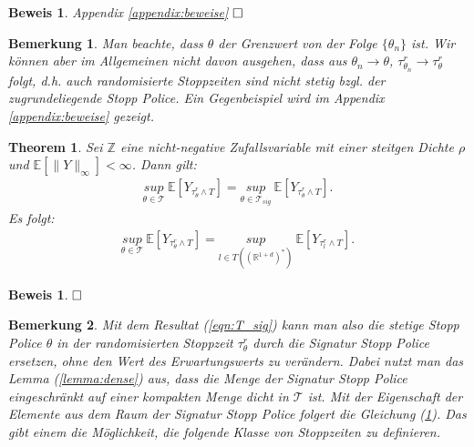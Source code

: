 \documentclass[12pt,titlepage,headsepline]{article}
\newtheorem{theorem}{Theorem}[section]
\newtheorem*{beweis}{Beweis}
\newtheorem*{beweis-non}{Beweis}
\newtheorem*{bemerkung*}{Bemerkung}
\begin{document}
      \begin{beweis}
        \textup{
        Appendix \ref{appendix:beweise}
        }
        $\hfill\Box$
      \end{beweis}
      \begin{bemerkung*}
        \textup{
        Man beachte, dass $\theta$ der Grenzwert von der Folge $\{\theta_n\}$ ist. Wir können aber im Allgemeinen nicht davon ausgehen, dass aus $\theta_n \rightarrow \theta$, $\tau_{\theta_n}^r \rightarrow \tau_\theta^r$ folgt, d.h. auch randomisierte Stoppzeiten sind nicht stetig bzgl. der zugrundeliegende Stopp Police. Ein Gegenbeispiel wird im Appendix \ref{appendix:beweise} gezeigt.
        }
      \end{bemerkung*}

      \begin{theorem}
        Sei $\mathbb{Z}$ eine nicht-negative Zufallsvariable mit einer steitgen Dichte $\rho$ und $\mathbb{E}[\lVert Y\rVert_\infty]<\infty$. Dann gilt:
        \begin{align}\label{eqn:T_sig}
          \underset{\theta \in \mathcal{T}}{sup} \ \mathbb{E}[Y_{\tau^{r}_{\theta}\land T}] = \underset{\theta \in \mathcal{T}_{sig}}{sup} \ \mathbb{E}[Y_{\tau^{r}_{\theta}\land T}].
        \end{align}
        Es folgt:
        \begin{align}
          \underset{\theta \in \mathcal{T}}{sup} \ \mathbb{E}[Y_{\tau^{r}_{\theta}\land T}] = \underset{l \in T((\mathbb{R}^{1+d})^*)}{sup} \ \mathbb{E}[Y_{\tau^{r}_{l}\land T}].
        \end{align}\label{eqn:l_T}
      \end{theorem}
      \begin{beweis-non}
        \textup{
        \cite{bayer_optimal_2020,Prop 5.3}
        $\hfill\Box$
        }
      \end{beweis-non}
      \begin{bemerkung*}
        \textup{
        Mit dem Resultat (\ref{eqn:T_sig}) kann man also die stetige Stopp Police $\theta$ in der randomisierten Stoppzeit $\tau^{r}_{\theta}$ durch die Signatur Stopp Police ersetzen, ohne den Wert des Erwartungswerts zu verändern. Dabei nutzt man das Lemma (\ref{lemma:dense}) aus, dass die Menge der Signatur Stopp Police eingeschränkt auf einer kompakten Menge dicht in $\mathcal{T}$ ist. Mit der Eigenschaft der Elemente aus dem Raum der Signatur Stopp Police folgert die Gleichung (\ref{eqn:l_T}). Das gibt einem die Möglichkeit, die folgende Klasse von Stoppzeiten zu definieren.
        }
      \end{bemerkung*}
\end{document}
